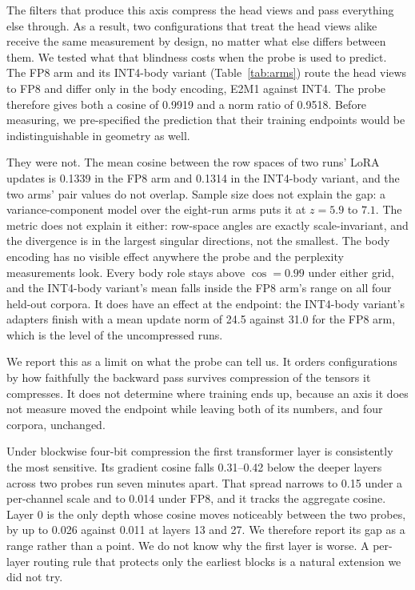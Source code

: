 \documentclass[11pt,letterpaper]{article}
\begin{document}
\medskip
The filters that produce this axis compress the head views and pass everything else through. As a result, two configurations that treat the head views alike receive the same measurement by design, no matter what else differs between them. We tested what that blindness costs when the probe is used to predict. The FP8 arm and its INT4-body variant (Table~\ref{tab:arms}) route the head views to FP8 and differ only in the body encoding, E2M1 against INT4. The probe therefore gives both a cosine of 0.9919 and a norm ratio of 0.9518. Before measuring, we pre-specified the prediction that their training endpoints would be indistinguishable in geometry as well.

They were not. The mean cosine between the row spaces of two runs' LoRA updates is 0.1339 in the FP8 arm and 0.1314 in the INT4-body variant, and the two arms' pair values do not overlap. Sample size does not explain the gap: a variance-component model over the eight-run arms puts it at $z = 5.9$ to $7.1$. The metric does not explain it either: row-space angles are exactly scale-invariant, and the divergence is in the largest singular directions, not the smallest. The body encoding has no visible effect anywhere the probe and the perplexity measurements look. Every body role stays above $\cos = 0.99$ under either grid, and the INT4-body variant's mean falls inside the FP8 arm's range on all four held-out corpora. It does have an effect at the endpoint: the INT4-body variant's adapters finish with a mean update norm of 24.5 against 31.0 for the FP8 arm, which is the level of the uncompressed runs.

We report this as a limit on what the probe can tell us. It orders configurations by how faithfully the backward pass survives compression of the tensors it compresses. It does not determine where training ends up, because an axis it does not measure moved the endpoint while leaving both of its numbers, and four corpora, unchanged.


Under blockwise four-bit compression the first transformer layer is consistently the most sensitive. Its gradient cosine falls 0.31--0.42 below the deeper layers across two probes run seven minutes apart. That spread narrows to 0.15 under a per-channel scale and to 0.014 under FP8, and it tracks the aggregate cosine. Layer 0 is the only depth whose cosine moves noticeably between the two probes, by up to 0.026 against 0.011 at layers 13 and 27. We therefore report its gap as a range rather than a point. We do not know why the first layer is worse. A per-layer routing rule that protects only the earliest blocks is a natural extension we did not try.
\end{document}

